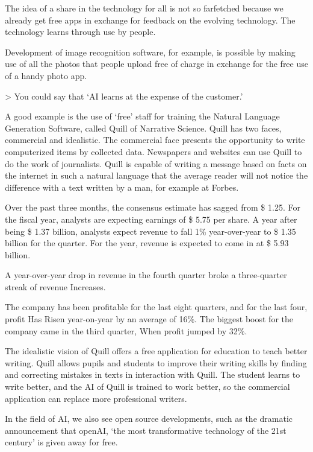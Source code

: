 \documentclass[11pt]{article}
\begin{document}
The idea of a share in the technology for all is not so farfetched because we already get free apps in exchange for feedback on the evolving technology. The technology learns through use by people.

Development of image recognition software, for example, is possible by making use of all the photos that people upload free of charge in exchange for the free use of a handy photo app.

> You could say that ‘AI learns at the expense of the customer.’

A good example is the use of ‘free’ staff for training the Natural Language Generation Software, called Quill of Narrative Science. Quill has two faces, commercial and idealistic. The commercial face presents the opportunity to write computerized items by collected data. Newspapers and websites can use Quill to do the work of journalists. Quill is capable of writing a message based on facts on the internet in such a natural language that the average reader will not notice the difference with a text written by a man, for example at Forbes.

Over the past three months, the consensus estimate has sagged from \$ 1.25. For the fiscal year, analysts are expecting earnings of \$ 5.75 per share. A year after being \$ 1.37 billion, analysts expect revenue to fall 1\% year-over-year to \$ 1.35 billion for the quarter. For the year, revenue is expected to come in at \$ 5.93 billion.

A year-over-year drop in revenue in the fourth quarter broke a three-quarter streak of revenue Increases.

The company has been profitable for the last eight quarters, and for the last four, profit Has Risen year-on-year by an average of 16\%. The biggest boost for the company came in the third quarter, When profit jumped by 32\%.

The idealistic vision of Quill offers a free application for education to teach better writing. Quill allows pupils and students to improve their writing skills by finding and correcting mistakes in texts in interaction with Quill. The student learns to write better, and the AI of Quill is trained to work better, so the commercial application can replace more professional writers.

In the field of AI, we also see open source developments, such as the dramatic announcement that openAI, ‘the most transformative technology of the 21st century’ is given away for free.
\end{document}
